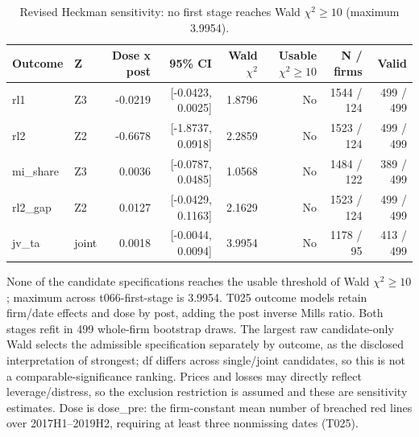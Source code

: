 \begin{table}[htbp]
\centering
\caption{Revised Heckman sensitivity: no first stage reaches Wald $\chi^2 \geq 10$ (maximum 3.9954).}
\begingroup\small
\setlength{\tabcolsep}{3pt}
\begin{tabular}{llrrrrrr}
\toprule
Outcome & Z & Dose x post & 95\% CI & Wald $\chi^2$ & \shortstack{Usable\\$\chi^2\geq10$} & N / firms & Valid \\
\midrule
rl1 & Z3 & -0.0219 & [-0.0423, 0.0025] & 1.8796 & No & 1544 / 124 & 499 / 499 \\
rl2 & Z2 & -0.6678 & [-1.8737, 0.0918] & 2.2859 & No & 1523 / 124 & 499 / 499 \\
mi\_share & Z3 & 0.0036 & [-0.0787, 0.0485] & 1.0568 & No & 1484 / 122 & 389 / 499 \\
rl2\_gap & Z2 & 0.0127 & [-0.0429, 0.1163] & 2.1629 & No & 1523 / 124 & 499 / 499 \\
jv\_ta & joint & 0.0018 & [-0.0044, 0.0094] & 3.9954 & No & 1178 / 95 & 413 / 499 \\
\bottomrule
\end{tabular}
\par\medskip
\footnotesize None of the candidate specifications reaches the usable threshold of Wald $\chi^2 \geq 10$; maximum across t066-first-stage is 3.9954. T025 outcome models retain firm/date effects and dose by post, adding the post inverse Mills ratio. Both stages refit in 499 whole-firm bootstrap draws. The largest raw candidate-only Wald selects the admissible specification separately by outcome, as the disclosed interpretation of strongest; df differs across single/joint candidates, so this is not a comparable-significance ranking. Prices and losses may directly reflect leverage/distress, so the exclusion restriction is assumed and these are sensitivity estimates. Dose is dose\_pre: the firm-constant mean number of breached red lines over 2017H1--2019H2, requiring at least three nonmissing dates (T025).
\endgroup
\end{table}
